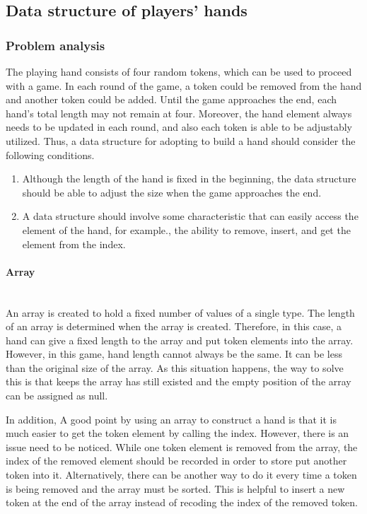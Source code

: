 \subsection{Data structure of players' hands}

\subsubsection{Problem analysis}
The playing hand consists of four random tokens, which can be used to proceed with a game. In each round of the game, a token could be removed from the hand and another token could be added. Until the game approaches the end, each hand's total length may not remain at four. Moreover, the hand element always needs to be updated in each round, and also each token is able to be adjustably utilized. Thus, a data structure for adopting to build a hand should consider the following conditions.  

\begin{enumerate}
	
   \item Although the length of the hand is fixed in the beginning, the data structure should be able to adjust the size when the game approaches the end. 
   
   \item  A data structure should involve some characteristic that can easily access the element of the hand,  for example.,  the ability to remove, insert, and get the element from the index.

\end{enumerate}

\paragraph{Array} \mbox{}\\

An array is created to hold a fixed number of values of a single type. The length of an array is determined when the array is created. Therefore, in this case, a hand can give a fixed length to the array and put token elements into the array. However,  in this game, hand length cannot always be the same. It can be less than the original size of the array. As this situation happens, the way to solve this is that keeps the array has still existed and the empty position of the array can be assigned as null. 

In addition, A good point by using an array to construct a hand is that it is much easier to get the token element by calling the index. However, there is an issue need to be noticed. While one token element is removed from the array, the index of the removed element should be recorded in order to store put another token into it. Alternatively, there can be another way to do it every time a token is being removed and the array must be sorted. This is helpful to insert a new token at the end of the array instead of recoding the index of the removed token. 



